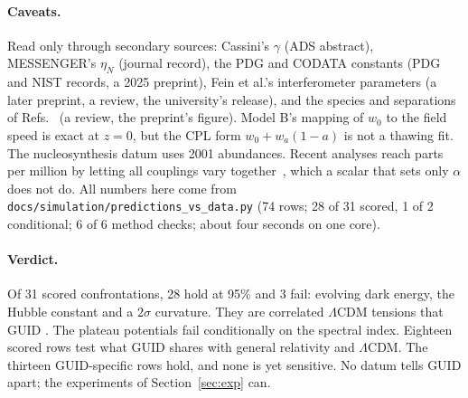 \paragraph{Caveats.} Read only through secondary sources: Cassini's $\gamma$ (ADS abstract), MESSENGER's $\eta_N$ (journal record), the PDG
and CODATA constants (PDG and NIST records, a 2025 preprint), Fein et al.'s interferometer parameters (a later preprint, a review, the
university's release), and the species and separations of Refs.~\cite{kovachy2015,xu2019} (a review, the preprint's figure). Model B's mapping
of $w_0$ to the field speed is exact at $z=0$, but the CPL form $w_0+w_a(1-a)$ is not a thawing fit. The nucleosynthesis datum uses 2001
abundances. Recent analyses reach parts per million by letting all couplings vary together~\cite{martins2021}, which a scalar that sets only
$\alpha$ does not do. All numbers here come from \texttt{docs/simulation/predictions\_vs\_data.py} (74 rows; 28 of 31 scored, 1 of 2
conditional; 6 of 6 method checks; about four seconds on one core).

\paragraph{Verdict.} Of 31 scored confrontations, 28 hold at 95\% and 3 fail: evolving dark energy, the Hubble constant and a $2\sigma$
curvature. They are correlated $\Lambda$CDM tensions that GUID . The plateau potentials fail conditionally on the spectral index.
Eighteen scored rows test what GUID shares with general relativity and $\Lambda$CDM. The thirteen GUID-specific rows hold, and none is yet
sensitive. No datum tells GUID apart; the experiments of Section~\ref{sec:exp} can.
